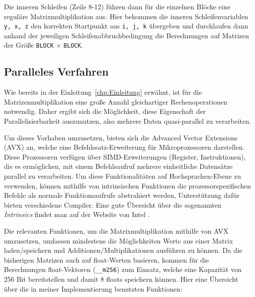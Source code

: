 \documentclass[a4paper,11pt]{scrartcl}
\begin{document}
Die inneren Schleifen (Zeile 8-12) führen dann für die einzelnen Blöcke eine reguläre 
Matrixmultiplikation aus. Hier bekommen die inneren Schleifenvariablen \texttt{y, x, z} den korrekten 
Startpunkt aus \texttt{i, j, k} übergeben und durchlaufen dann anhand der jeweiligen 
Schleifenabbruchbedingung die Berechnungen auf Matrizen der Größe \texttt{BLOCK} $\times$ \texttt{BLOCK}.

\subsection{Paralleles Verfahren}
Wie bereits in der Einleitung~\ref{chp:Einleitung} erwähnt, ist für die 
Matrizenmultiplikation eine große Anzahl gleichartiger Rechenoperationen notwendig.
Daher ergibt sich die Möglichkeit, diese Eigenschaft der Parallelisierbarkeit auszunutzen,
also mehrere Daten quasi-parallel zu verarbeiten.\newline

Um dieses Vorhaben umzusetzen, bieten sich die Advanced Vector Extensions (AVX) an,
welche eine Befehlssatz-Erweiterung für Mikroprozessoren darstellen. Diese Prozessoren
verfügen über SIMD-Erweiterungen (Register, Instruktionen), die es ermöglichen, mit einem Befehlsaufruf  mehrere einheitliche Datensätze parallel zu verarbeiten. Um diese Funktionalitäten auf 
Hochsprachen-Ebene zu verwenden, können mithilfe von intrinsischen Funktionen 
die prozessorspezifischen Befehle als normale Funktionsaufrufe abstrahiert werden,
Unterstützung dafür bieten verschiedene Compiler. Eine gute Übersicht über die sogenannten
\emph{Intrinsics} findet man auf der Website von Intel \cite{intr}.\newline

Die relevanten Funktionen, um die Matrixmultiplikation mithilfe von AVX umzusetzen,
umfassen mindestens die Möglichkeiten Werte aus einer Matrix laden/speichern
und Additionen/Multiplikationen ausführen zu können. Da die bisherigen Matrizen auch auf 
float-Werten basieren, kommen für die Berechnungen float-Vektoren (\texttt{\_\_m256}) zum
Einsatz, welche eine Kapazität von 256 Bit bereitstellen und damit 8 floats speichern
können. Hier eine Übersicht über die in meiner Implementierung benutzten Funktionen:\newline
\end{document}
